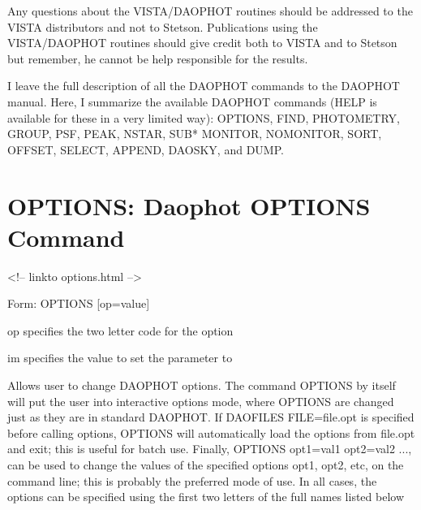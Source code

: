 Any questions about the VISTA/DAOPHOT routines should be addressed to the
VISTA distributors and not to Stetson. Publications using the VISTA/DAOPHOT
routines should give credit both to VISTA and to Stetson but remember, he
cannot be help responsible for the results.

I leave the full description of all the DAOPHOT commands to the DAOPHOT
manual. Here, I summarize the available DAOPHOT commands (HELP is available
for these in a very limited way): OPTIONS, FIND, PHOTOMETRY, GROUP, PSF,
PEAK, NSTAR, SUB* MONITOR, NOMONITOR, SORT, OFFSET, SELECT, APPEND, DAOSKY,
and DUMP.


\section{OPTIONS: Daophot OPTIONS Command}
\begin{rawhtml}
<!-- linkto options.html -->
\end{rawhtml}
\begin{command}
  \item[Form: OPTIONS {[op=value]} \hfill]{}
  \item[op]{specifies the two letter code for the option}
  \item[im]{specifies the value to set the parameter to}
\end{command}

Allows user to change DAOPHOT options. 
The command OPTIONS by itself will put the
user into interactive options mode, where OPTIONS are changed just as they
are in standard DAOPHOT. If DAOFILES FILE=file.opt is specified before
calling options, OPTIONS will automatically load the options from file.opt
and exit; this is useful for batch use. Finally, OPTIONS opt1=val1
opt2=val2 ..., can be used to change the values of the specified options
opt1, opt2, etc, on the command line; this is probably the preferred mode
of use. In all cases, the options can be specified using the first
two letters of the full names listed below

